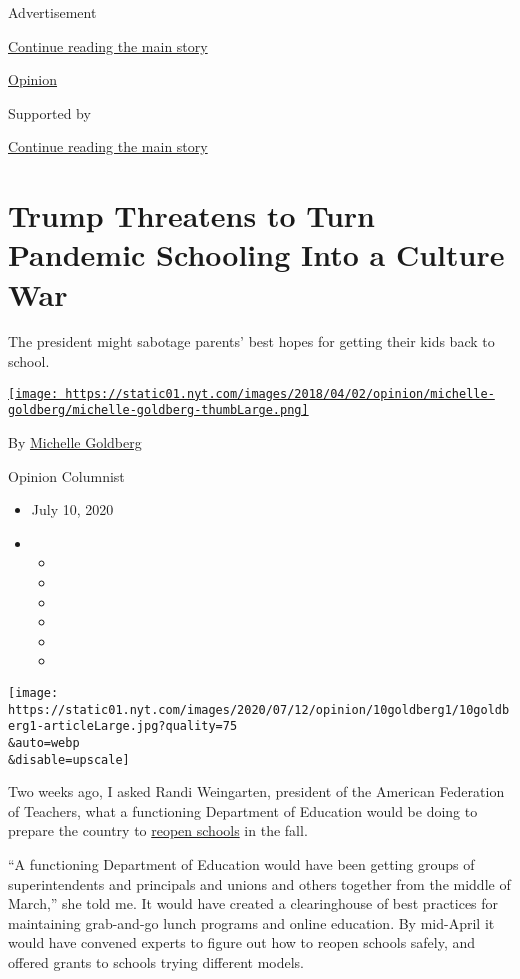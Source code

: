 Advertisement

\protect\hyperlink{after-top}{Continue reading the main story}

\href{/section/opinion}{Opinion}

Supported by

\protect\hyperlink{after-sponsor}{Continue reading the main story}

\hypertarget{trump-threatens-to-turn-pandemic-schooling-into-a-culture-war}{%
\section{Trump Threatens to Turn Pandemic Schooling Into a Culture
War}\label{trump-threatens-to-turn-pandemic-schooling-into-a-culture-war}}

The president might sabotage parents' best hopes for getting their kids
back to school.

\href{https://www.nytimes.com/by/michelle-goldberg}{\texttt{[image: https://static01.nyt.com/images/2018/04/02/opinion/michelle-goldberg/michelle-goldberg-thumbLarge.png]}}

By \href{https://www.nytimes.com/by/michelle-goldberg}{Michelle
Goldberg}

Opinion Columnist

\begin{itemize}
\item
  July 10, 2020
\item
  \begin{itemize}
  \item
  \item
  \item
  \item
  \item
  \item
  \end{itemize}
\end{itemize}

\texttt{[image: https://static01.nyt.com/images/2020/07/12/opinion/10goldberg1/10goldberg1-articleLarge.jpg?quality=75\\\&auto=webp\\\&disable=upscale]}

Two weeks ago, I asked Randi Weingarten, president of the American
Federation of Teachers, what a functioning Department of Education would
be doing to prepare the country to
\href{https://www.nytimes.com/2020/07/10/us/politics/trump-schools-reopening.html}{reopen
schools} in the fall.

``A functioning Department of Education would have been getting groups
of superintendents and principals and unions and others together from
the middle of March,'' she told me. It would have created a
clearinghouse of best practices for maintaining grab-and-go lunch
programs and online education. By mid-April it would have convened
experts to figure out how to reopen schools safely, and offered grants
to schools trying different models.


